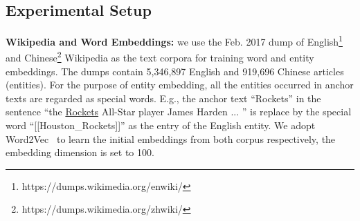 \subsection{Experimental Setup}
\label{sec:exp-setup}



\noindent
\textbf{Wikipedia and Word Embeddings:}
we use the Feb. 2017 dump of English\footnote{https://dumps.wikimedia.org/enwiki/}
and Chinese\footnote{https://dumps.wikimedia.org/zhwiki/} Wikipedia
as the text corpora for training word and entity embeddings.
The dumps contain 5,346,897 English and 919,696 Chinese articles (entities).
For the purpose of entity embedding,
all the entities occurred in anchor texts are regarded as special words.
E.g., the anchor text ``Rockets'' in the sentence
``the \underline{Rockets} All-Star player James Harden ... ''
is replace by the special word ``[[Houston\_Rockets]]'' as the entry of the English entity.
We adopt Word2Vec~\cite{mikolov2013distributed} to learn the initial embeddings from both corpus respectively,
the embedding dimension is set to 100.

